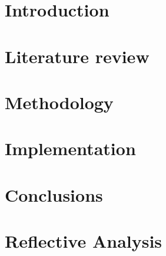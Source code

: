 \documentclass{lincolncsuthesis}
\begin{document}
\maketitle







\thesisTables
\thesisBodyStart





\chapter{Introduction}


\chapter{Literature review}


\chapter{Methodology}


\chapter{Implementation}


\chapter{Conclusions}


\chapter{Reflective Analysis}

\end{document}
